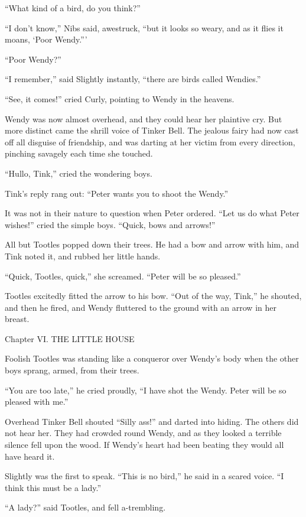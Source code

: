 ``What kind of a bird, do you think?''

``I don't know,'' Nibs said, awestruck, ``but it looks so weary, and as it
flies it moans, ‘Poor Wendy.'''

``Poor Wendy?''

``I remember,'' said Slightly instantly, ``there are birds called
Wendies.''

``See, it comes!'' cried Curly, pointing to Wendy in the heavens.

Wendy was now almost overhead, and they could hear her plaintive cry.
But more distinct came the shrill voice of Tinker Bell. The jealous
fairy had now cast off all disguise of friendship, and was darting at
her victim from every direction, pinching savagely each time she
touched.

``Hullo, Tink,'' cried the wondering boys.

Tink's reply rang out: ``Peter wants you to shoot the Wendy.''

It was not in their nature to question when Peter ordered. ``Let us do
what Peter wishes!'' cried the simple boys. ``Quick, bows and arrows!''

All but Tootles popped down their trees. He had a bow and arrow with
him, and Tink noted it, and rubbed her little hands.

``Quick, Tootles, quick,'' she screamed. ``Peter will be so pleased.''

Tootles excitedly fitted the arrow to his bow. ``Out of the way, Tink,''
he shouted, and then he fired, and Wendy fluttered to the ground with
an arrow in her breast.




Chapter VI.
THE LITTLE HOUSE


Foolish Tootles was standing like a conqueror over Wendy's body when
the other boys sprang, armed, from their trees.

``You are too late,'' he cried proudly, ``I have shot the Wendy. Peter
will be so pleased with me.''

Overhead Tinker Bell shouted ``Silly ass!'' and darted into hiding. The
others did not hear her. They had crowded round Wendy, and as they
looked a terrible silence fell upon the wood. If Wendy's heart had been
beating they would all have heard it.

Slightly was the first to speak. ``This is no bird,'' he said in a scared
voice. ``I think this must be a lady.''

``A lady?'' said Tootles, and fell a-trembling.

